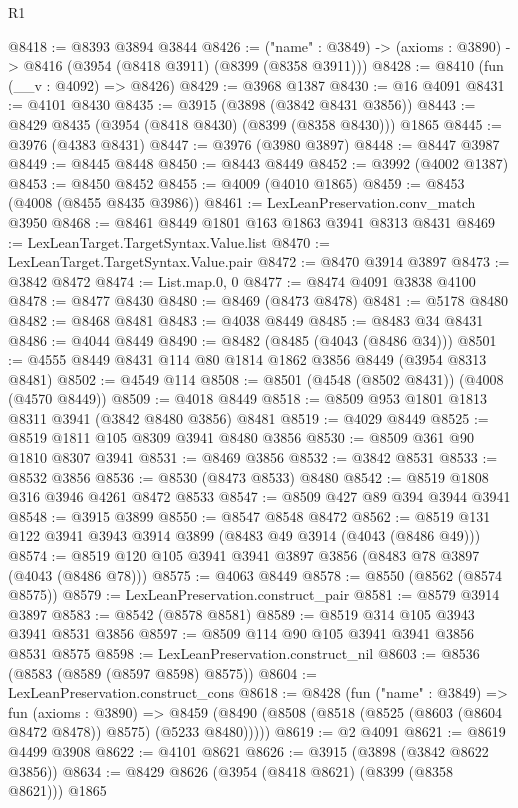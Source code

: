 \begin{lexlean}{R1}
\begin{coremodule}
@8418 := @8393 @3894 @3844
@8426 := ("name" : @3849) -> (axioms : @3890) -> @8416 (@3954 (@8418 @3911) (@8399 (@8358 @3911)))
@8428 := @8410 (fun (__v : @4092) => @8426)
@8429 := @3968 @1387
@8430 := @16 @4091
@8431 := @4101 @8430
@8435 := @3915 (@3898 (@3842 @8431 @3856))
@8443 := @8429 @8435 (@3954 (@8418 @8430) (@8399 (@8358 @8430))) @1865
@8445 := @3976 (@4383 @8431)
@8447 := @3976 (@3980 @3897)
@8448 := @8447 @3987
@8449 := @8445 @8448
@8450 := @8443 @8449
@8452 := @3992 (@4002 @1387)
@8453 := @8450 @8452
@8455 := @4009 (@4010 @1865)
@8459 := @8453 (@4008 (@8455 @8435 @3986))
@8461 := LexLeanPreservation.conv_match @3950
@8468 := @8461 @8449 @1801 @163 @1863 @3941 @8313 @8431
@8469 := LexLeanTarget.TargetSyntax.Value.list
@8470 := LexLeanTarget.TargetSyntax.Value.pair
@8472 := @8470 @3914 @3897
@8473 := @3842 @8472
@8474 := List.map.{0, 0}
@8477 := @8474 @4091 @3838 @4100
@8478 := @8477 @8430
@8480 := @8469 (@8473 @8478)
@8481 := @5178 @8480
@8482 := @8468 @8481
@8483 := @4038 @8449
@8485 := @8483 @34 @8431
@8486 := @4044 @8449
@8490 := @8482 (@8485 (@4043 (@8486 @34)))
@8501 := @4555 @8449 @8431 @114 @80 @1814 @1862 @3856 @8449 (@3954 @8313 @8481)
@8502 := @4549 @114
@8508 := @8501 (@4548 (@8502 @8431)) (@4008 (@4570 @8449))
@8509 := @4018 @8449
@8518 := @8509 @953 @1801 @1813 @8311 @3941 (@3842 @8480 @3856) @8481
@8519 := @4029 @8449
@8525 := @8519 @1811 @105 @8309 @3941 @8480 @3856
@8530 := @8509 @361 @90 @1810 @8307 @3941
@8531 := @8469 @3856
@8532 := @3842 @8531
@8533 := @8532 @3856
@8536 := @8530 (@8473 @8533) @8480
@8542 := @8519 @1808 @316 @3946 @4261 @8472 @8533
@8547 := @8509 @427 @89 @394 @3944 @3941
@8548 := @3915 @3899
@8550 := @8547 @8548 @8472
@8562 := @8519 @131 @122 @3941 @3943 @3914 @3899 (@8483 @49 @3914 (@4043 (@8486 @49)))
@8574 := @8519 @120 @105 @3941 @3941 @3897 @3856 (@8483 @78 @3897 (@4043 (@8486 @78)))
@8575 := @4063 @8449
@8578 := @8550 (@8562 (@8574 @8575))
@8579 := LexLeanPreservation.construct_pair
@8581 := @8579 @3914 @3897
@8583 := @8542 (@8578 @8581)
@8589 := @8519 @314 @105 @3943 @3941 @8531 @3856
@8597 := @8509 @114 @90 @105 @3941 @3941 @3856 @8531 @8575
@8598 := LexLeanPreservation.construct_nil
@8603 := @8536 (@8583 (@8589 (@8597 @8598) @8575))
@8604 := LexLeanPreservation.construct_cons
@8618 := @8428
    (fun ("name" : @3849) =>
    fun (axioms : @3890) =>
    @8459 (@8490 (@8508 (@8518 (@8525 (@8603 (@8604 @8472 @8478)) @8575) (@5233 @8480)))))
@8619 := @2 @4091
@8621 := @8619 @4499 @3908
@8622 := @4101 @8621
@8626 := @3915 (@3898 (@3842 @8622 @3856))
@8634 := @8429 @8626 (@3954 (@8418 @8621) (@8399 (@8358 @8621))) @1865

\end{coremodule}
\end{lexlean}
